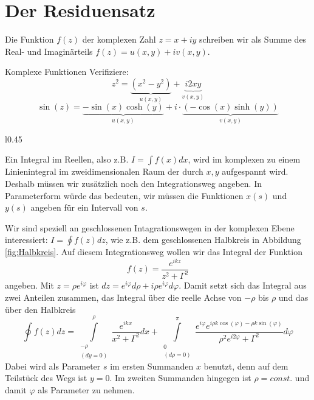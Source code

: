 \chapter{Der Residuensatz}\label{sec:Residuensatz}
Die Funktion $f(z)$ der komplexen Zahl $z=x+iy$ schreiben wir als Summe des
Real- und Imaginärteils $f(z)=u(x,y)+iv(x,y)$.
\begin{example}{Komplexe Funktionen}
  Verifiziere:
  \[ z^2=\underbrace{(x^2-y^2)}_{u(x,y)}+\underbrace{i2xy}_{v(x,y)}\]
  \[\sin(z)=\underbrace{-\sin(x)\cosh(y)}_{u(x,y)}+i\cdot\underbrace{(-\cos(x)\sinh(y))}_{v(x,y)}\]
\end{example}

\begin{wrapfigure}[12]{l}{0.45\textwidth}
 \begin{center}
  \caption{Integrationsweg in der komplexen Ebene.\label{fig:Halbkreis}}
 \end{center}
\end{wrapfigure}
Ein Integral im Reellen, also z.B. $I=\int f(x)dx$, wird im komplexen zu einem
Linienintegral im zweidimensionalen Raum der durch $x,y$ aufgespannt wird.
Deshalb müssen wir zusätzlich noch den Integrationsweg angeben. In
Parameterform würde das bedeuten, wir müssen die Funktionen $x(s)$ und $y(s)$
angeben für ein Intervall von $s$.

Wir sind speziell an geschlossenen Intagrationswegen in der komplexen Ebene interessiert:
$I=\oint f(z)dz$, wie z.B. dem geschlossenen Halbkreis in Abbildung
\ref{fig:Halbkreis}. Auf diesem Integrationsweg wollen wir das Integral der Funktion
\[f(z)=\frac{e^{ikz}}{z^2+\Gamma^2}\]
angeben. Mit $z=\rho e^{i\varphi}$ ist $dz=e^{i\varphi}d\rho+i\rho
e^{i\varphi}d\varphi$.  Damit setzt sich das Integral aus zwei Anteilen
zusammen, das Integral über die reelle Achse von $-\rho$ bis $\rho$ und das
über den Halbkreis
\[\oint f(z)dz=\int\limits_{\substack{-\rho\\ (dy=0)}}^{\rho}\frac{e^{ikx}}{x^2+\Gamma^2}dx+
  \int\limits_{\substack{0\\(d\rho=0)}}^{\pi}\frac{e^{i\varphi}
  e^{i\rho k\cos(\varphi)-\rho k\sin(\varphi)}}{\rho^2e^{i2\varphi}+\Gamma^2}d\varphi
\]
Dabei wird als Parameter $s$ im ersten Summanden $x$ benutzt, denn auf dem
Teilstück des Wegs ist $y=0$. Im zweiten Summanden hingegen ist $\rho=const.$
und damit $\varphi$ als Parameter zu nehmen.

